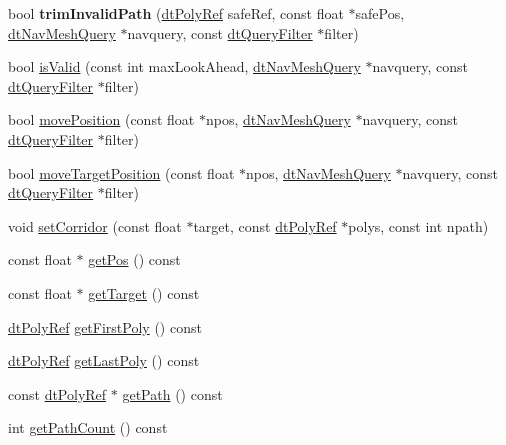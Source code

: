 \begin{DoxyCompactItemize}
\item 
\mbox{\label{classdtPathCorridor_a5ed6daf1e663f2b0a854794e431514c8}} 
bool {\bfseries trim\+Invalid\+Path} (\hyperlink{group__detour_gab4e0b2257a670c1a800057999612b466}{dt\+Poly\+Ref} safe\+Ref, const float $\ast$safe\+Pos, \hyperlink{classdtNavMeshQuery}{dt\+Nav\+Mesh\+Query} $\ast$navquery, const \hyperlink{classdtQueryFilter}{dt\+Query\+Filter} $\ast$filter)
\item 
bool \hyperlink{classdtPathCorridor_aeb23d3697b0e17837b06b13ae5be4e52}{is\+Valid} (const int max\+Look\+Ahead, \hyperlink{classdtNavMeshQuery}{dt\+Nav\+Mesh\+Query} $\ast$navquery, const \hyperlink{classdtQueryFilter}{dt\+Query\+Filter} $\ast$filter)
\item 
bool \hyperlink{classdtPathCorridor_a320a804c422fdb9b58f677b9b42ebf22}{move\+Position} (const float $\ast$npos, \hyperlink{classdtNavMeshQuery}{dt\+Nav\+Mesh\+Query} $\ast$navquery, const \hyperlink{classdtQueryFilter}{dt\+Query\+Filter} $\ast$filter)
\item 
bool \hyperlink{classdtPathCorridor_a66f8097a4f49c077b6c6da5c727c6877}{move\+Target\+Position} (const float $\ast$npos, \hyperlink{classdtNavMeshQuery}{dt\+Nav\+Mesh\+Query} $\ast$navquery, const \hyperlink{classdtQueryFilter}{dt\+Query\+Filter} $\ast$filter)
\item 
void \hyperlink{classdtPathCorridor_af26a1205a7e38f0389a2dcb2dc23ca9b}{set\+Corridor} (const float $\ast$target, const \hyperlink{group__detour_gab4e0b2257a670c1a800057999612b466}{dt\+Poly\+Ref} $\ast$polys, const int npath)
\item 
const float $\ast$ \hyperlink{classdtPathCorridor_a607e96864c9cb68386d57e90d8681159}{get\+Pos} () const
\item 
const float $\ast$ \hyperlink{classdtPathCorridor_aa1ea66fedbbab0cabfb279287aee392b}{get\+Target} () const
\item 
\hyperlink{group__detour_gab4e0b2257a670c1a800057999612b466}{dt\+Poly\+Ref} \hyperlink{classdtPathCorridor_a1328df3808790d4bedec54112b0fab43}{get\+First\+Poly} () const
\item 
\hyperlink{group__detour_gab4e0b2257a670c1a800057999612b466}{dt\+Poly\+Ref} \hyperlink{classdtPathCorridor_a4d23baaf31661832ea81fd5a6fcc0a59}{get\+Last\+Poly} () const
\item 
const \hyperlink{group__detour_gab4e0b2257a670c1a800057999612b466}{dt\+Poly\+Ref} $\ast$ \hyperlink{classdtPathCorridor_adc4aee4a1867ce60e6b319edc686661f}{get\+Path} () const
\item 
int \hyperlink{classdtPathCorridor_a16bfdb275fb8f385c269cd06236f8213}{get\+Path\+Count} () const
\end{DoxyCompactItemize}


